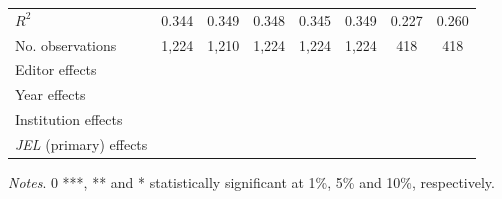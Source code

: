 \begin{table}
\begin{adjustwidth}{-0.085cm}{}
\begin{threeparttable}
\begin{tabular}{p{2.64cm}SSSSSSS}
            \midrule
            \(R^2\)                       &       0.344   &       0.349   &       0.348   &       0.345   &       0.349   &       0.227   &       0.260   \\
            No. observations              &       1,224   &       1,210   &       1,224   &       1,224   &       1,224   &         418   &         418   \\
            \midrule
            Editor effects        &           {}   &           {}   &           {}   &           {}   &           {}   &           {}   &           {}   \\
            Year effects                  &           {}   &           {}   &           {}   &           {}   &           {}   &           {}   &           {}   \\
            Institution effects           &           {}   &           {}   &           {}   &           {}   &           {}   &           {}   &           {}   \\
            \textit{JEL} (primary) effects&               &               &               &               &               &               &           {}   \\
            \bottomrule
        \end{tabular}
        \begin{tablenotes}
            \tiny
            \item \textit{Notes}. 0 ***, ** and * statistically significant at 1\%, 5\% and 10\%, respectively.
        \end{tablenotes}
    \end{threeparttable}
    \end{adjustwidth}
\end{table}